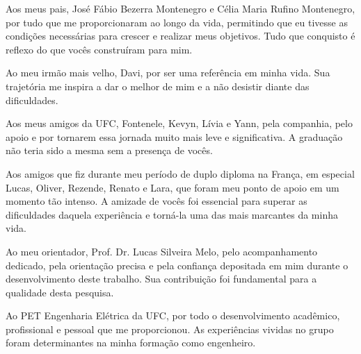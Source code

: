 
Aos meus pais, José Fábio Bezerra Montenegro e Célia Maria Rufino Montenegro, por tudo que me proporcionaram ao longo da vida, permitindo que eu tivesse as condições necessárias para crescer e realizar meus objetivos. Tudo que conquisto é reflexo do que vocês construíram para mim.

Ao meu irmão mais velho, Davi, por ser uma referência em minha vida. Sua trajetória me inspira a dar o melhor de mim e a não desistir diante das dificuldades.

Aos meus amigos da UFC, Fontenele, Kevyn, Lívia e Yann, pela companhia, pelo apoio e por tornarem essa jornada muito mais leve e significativa. A graduação não teria sido a mesma sem a presença de vocês.

Aos amigos que fiz durante meu período de duplo diploma na França, em especial Lucas, Oliver, Rezende, Renato e Lara, que foram meu ponto de apoio em um momento tão intenso. A amizade de vocês foi essencial para superar as dificuldades daquela experiência e torná-la uma das mais marcantes da minha vida.

Ao meu orientador, Prof. Dr. Lucas Silveira Melo, pelo acompanhamento dedicado, pela orientação precisa e pela confiança depositada em mim durante o desenvolvimento deste trabalho. Sua contribuição foi fundamental para a qualidade desta pesquisa.

Ao PET Engenharia Elétrica da UFC, por todo o desenvolvimento acadêmico, profissional e pessoal que me proporcionou. As experiências vividas no grupo foram determinantes na minha formação como engenheiro.
